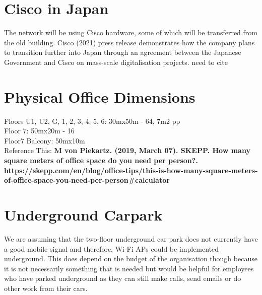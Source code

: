 \section{Cisco in Japan}
The network will be using Cisco hardware, some of which will be transferred from the old 
building. Cisco (2021) press release demonstrates how the company plans to transition further into Japan through an agreement between the Japanese Government and Cisco on mass-scale digitalisation projects.
need to cite \parencite{cisco-japan}
\section{Physical Office Dimensions}
Floors U1, U2, G, 1, 2, 3, 4, 5, 6: 30mx50m - 64, 7m2 pp \\
Floor 7: 50mx20m - 16 \\
Floor7 Balcony: 50mx10m \\
Reference This: \textbf{M von Piekartz. (2019, March 07). SKEPP. How many square meters of office space do you need per person?. https://skepp.com/en/blog/office-tips/this-is-how-many-square-meters-of-office-space-you-need-per-person#calculator}
\section{Underground Carpark}
We are assuming that the two-floor underground car park does not currently have a good mobile signal and therefore, Wi-Fi APs could be implemented underground. This does depend on the budget of the organisation though because it is not necessarily something that is needed but would be helpful for employees who have parked underground as they can still make calls, send emails or do other work from their cars.
